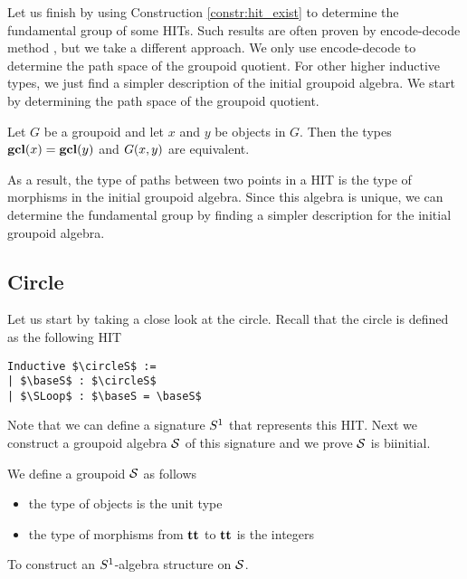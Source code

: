 Let us finish by using Construction \ref{constr:hit_exist} to determine the fundamental group of some HITs.
Such results are often proven by encode-decode method \cite{LicataS13,LicataF14}, but we take a different approach.
We only use encode-decode to determine the path space of the groupoid quotient.
For other higher inductive types, we just find a simpler description of the initial groupoid algebra.
We start by determining the path space of the groupoid quotient.

\begin{proposition}
\label{prop:groupoid_quot_encode_decode}
Let $G$ be a groupoid and let $x$ and $y$ be objects in $G$.
Then the types $\operatorname{\mathbf{gcl}}(x) = \operatorname{\mathbf{gcl}}(y)$ and $G(x, y)$ are equivalent.
\end{proposition}

As a result, the type of paths between two points in a HIT is the type of morphisms in the initial groupoid algebra.
Since this algebra is unique, we can determine the fundamental group by finding a simpler description for the initial groupoid algebra.

\subsection{Circle}
\label{sec:circle_fund_group}
Let us start by taking a close look at the circle.
Recall that the circle is defined as the following HIT

\begin{lstlisting}[mathescape=true]
Inductive $\circleS$ :=
| $\baseS$ : $\circleS$
| $\SLoop$ : $\baseS = \baseS$
\end{lstlisting}

Note that we can define a signature $S^1$ that represents this HIT.
Next we construct a groupoid algebra $\mathcal{S}$ of this signature and we prove $\mathcal{S}$ is biinitial.

\begin{definition}
We define a groupoid $\mathcal{S}$ as follows
\begin{itemize}
	\item the type of objects is the unit type
	\item the type of morphisms from $\operatorname{\mathbf{tt}}$ to $\operatorname{\mathbf{tt}}$ is the integers
\end{itemize}
\end{definition}

\begin{problem}
\label{prob:initial_grpd_alg_circle}
To construct an $S^1$-algebra structure on $\mathcal{S}$.
\end{problem}

